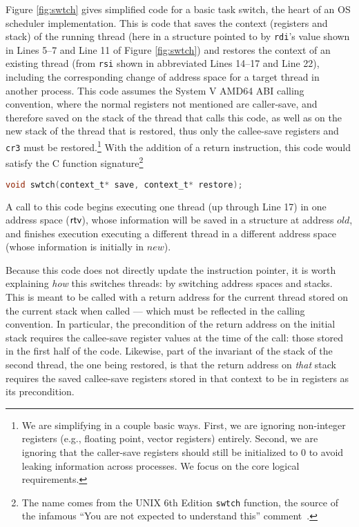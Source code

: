 Figure \ref{fig:swtch} gives simplified code for a basic task switch, the heart of an OS scheduler implementation. This is code that saves the context (registers and stack)
of the running thread (here in a structure pointed to by \lstinline|rdi|'s value shown in Lines 5--7 and Line 11 of Figure \ref{fig:swtch}) and restores the context of 
an existing thread (from \lstinline|rsi| shown in abbreviated Lines 14--17 and Line 22), including the corresponding change of address space for a target thread in another process.
This code assumes the System V AMD64 ABI calling convention, where the normal registers not mentioned are caller-save, and therefore saved on the stack of the thread
that calls this code, as well as on the new stack of the thread that is restored, thus only the callee-save registers and \texttt{cr3} must be 
restored.\footnote{We are simplifying in a couple basic ways. First, we are ignoring non-integer registers (e.g., floating point, vector registers) entirely. Second, we are ignoring that the caller-save registers should still be initialized to 0 to avoid leaking information across processes. We focus on the core logical requirements.}
With the addition of a return instruction, this code would satisfy the C function signature\footnote{The name comes from the UNIX 6th Edition \lstinline|swtch| function, the source of the infamous ``You are not expected to understand this'' comment~\cite{lions1996lions}.}
\begin{lstlisting}[language=C]
void swtch(context_t* save, context_t* restore);
\end{lstlisting}
A call to this code begins executing one thread (up through Line 17) in one address space ($\textsf{rtv}$), whose information will be saved in a structure at address $old$,
and finishes execution executing a different thread in a different address space (whose information is initially in $new$).

Because this code does not directly update the instruction pointer, it is worth explaining \emph{how} this switches threads: by switching address spaces and stacks. 
This is meant to be called with a return address for the current thread stored on the current stack when called --- which must be reflected in the calling convention. 
In particular, the precondition of the return address on the initial stack requires the callee-save register values at the time of the call: those stored in the first 
half of the code.
Likewise, part of the invariant of the stack of the second thread, the one being restored, is that the return address on \emph{that} stack requires the saved 
callee-save registers stored in that context to be in registers as its precondition.

